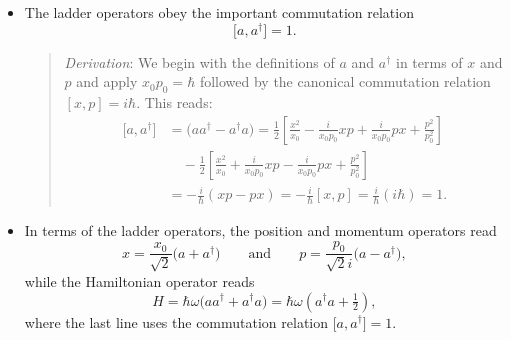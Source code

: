 \documentclass[11pt, a4paper]{article}
\begin{document}
\begin{itemize}
    \item The ladder operators obey the important commutation relation
	\begin{equation*}
		\big[a, a^{\dagger}\big] = 1.
	\end{equation*}
    \begin{quote}
        \textit{Derivation}: We begin with the definitions of $ a $ and $ a^{\dagger} $ in terms of $ x $ and $ p $ and apply $ x_{0}p_{0} = \hbar $ followed by the canonical commutation relation $ [x, p] = i \hbar $. This reads:
        \begin{align*}
            \big[ a, a^{\dagger} \big] &= \big( a a^{\dagger} - a^{\dagger}a \big) = \frac{1}{2}\left[ \frac{x^{2}}{x_{0}} - \frac{i}{x_{0}p_{0}} xp + \frac{i}{x_{0}p_{0}} px + \frac{p^{2}}{p_{0}^{2}}  \right]\\
            &{}\quad - \frac{1}{2}\left[ \frac{x^{2}}{x_{0}} + \frac{i}{x_{0}p_{0}} xp - \frac{i}{x_{0}p_{0}} px + \frac{p^{2}}{p_{0}^{2}}  \right]\\
            & = - \frac{i}{\hbar} (xp - px) = -\frac{i}{\hbar} [x, p] = \frac{i}{\hbar}(i \hbar) = 1.
        \end{align*}
    \end{quote}

    \item In terms of the ladder operators, the position and momentum operators read 
    \begin{equation*}
        x = \frac{x_{0}}{\sqrt{2}} \big( a + a^{\dagger} \big) \qquad \text{and} \qquad  p = \frac{p_{0}}{\sqrt{2}i} \big( a - a^{\dagger} \big),
    \end{equation*}
    while the Hamiltonian operator reads
    \begin{equation*}
        H = \hbar \omega \big( aa^{\dagger} + a^{\dagger}a \big) = \hbar \omega \left( a^{\dagger}a + \tfrac{1}{2} \right),
    \end{equation*}
    where the last line uses the commutation relation $ \big[ a, a^{\dagger} \big] = 1 $.
    
\end{itemize}
\end{document}
